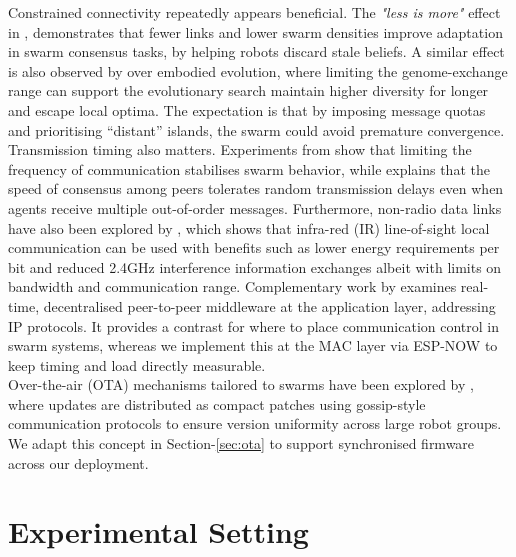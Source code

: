\documentclass[conference]{IEEEtran}
\begin{document}
Constrained connectivity repeatedly appears beneficial. The \emph{"less is more"} effect in \cite{talamali_when_2021}, demonstrates that fewer links and lower swarm densities improve adaptation in swarm consensus tasks, by helping robots discard stale beliefs. A similar effect is also observed by \cite{hiraga_when_2023} over embodied evolution, where limiting the genome-exchange range can support the evolutionary search maintain higher diversity for longer and escape local optima. The expectation is that by imposing message quotas and prioritising “distant” islands, the swarm could avoid premature convergence.\\

Transmission timing also matters. Experiments from \cite{aust_hidden_2022} show that limiting the frequency of communication stabilises swarm behavior, while \cite{tsianos_impact_2012} explains that the speed of consensus among peers tolerates random transmission delays even when agents receive multiple out-of-order messages. Furthermore, non-radio data links have also been explored by \cite{trenkwalder_swarmcom_2020}, which shows that infra-red (IR) line-of-sight local communication can be used with benefits such as lower energy requirements per bit and reduced 2.4GHz interference information exchanges albeit with limits on bandwidth and communication range. Complementary work by \cite{rabbah_real_2021} examines real-time, decentralised peer-to-peer middleware at the application layer, addressing IP protocols. It provides a contrast for where to place communication control in swarm systems, whereas we implement this at the MAC layer via ESP-NOW to keep timing and load directly measurable.\\

Over-the-air (OTA) mechanisms tailored to swarms have been explored by \cite{varadharajan_over--air_2018}, where updates are distributed as compact patches using gossip-style communication protocols to ensure version uniformity across large robot groups. We adapt this concept in Section-\ref{sec:ota} to support synchronised firmware across our deployment.\\



\section{Experimental Setting}
\end{document}
